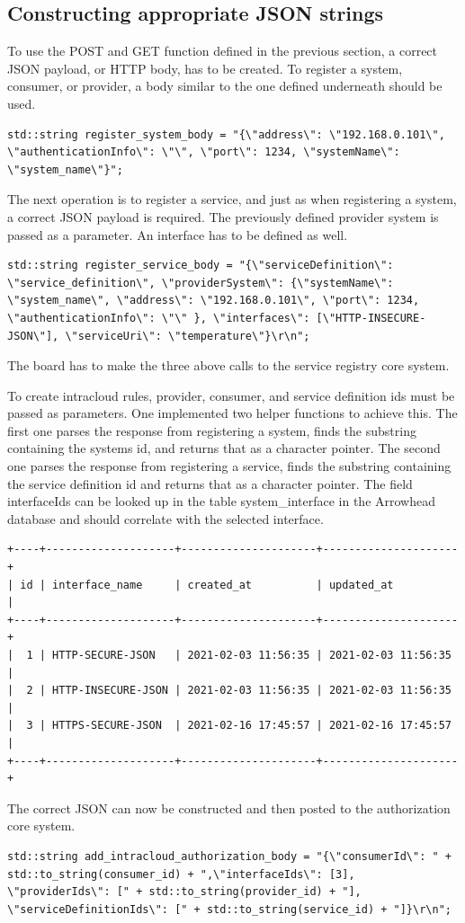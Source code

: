 \subsection{Constructing appropriate JSON strings}
To use the POST and GET function defined in the previous section, a correct JSON payload, or HTTP body, has to be created.
To register a system, consumer, or provider, a body similar to the one defined underneath should be used.
\begin{lstlisting}[style=CStyle]
    std::string register_system_body = "{\"address\": \"192.168.0.101\", \"authenticationInfo\": \"\", \"port\": 1234, \"systemName\": \"system_name\"}";
\end{lstlisting}

The next operation is to register a service, and just as when registering a system, a correct JSON payload is required.
The previously defined provider system is passed as a parameter.
An interface has to be defined as well.
\begin{lstlisting}[style=CStyle]
    std::string register_service_body = "{\"serviceDefinition\": \"service_definition\", \"providerSystem\": {\"systemName\": \"system_name\", \"address\": \"192.168.0.101\", \"port\": 1234, \"authenticationInfo\": \"\" }, \"interfaces\": [\"HTTP-INSECURE-JSON\"], \"serviceUri\": \"temperature\"}\r\n";
\end{lstlisting}
The board has to make the three above calls to the service registry core system.

To create intracloud rules, provider, consumer, and service definition ids must be passed as parameters.
One implemented two helper functions to achieve this.
The first one parses the response from registering a system, finds the substring containing the systems id, and returns that as a character pointer.
The second one parses the response from registering a service, finds the substring containing the service definition id and returns that as a character pointer.
The field interfaceIds can be looked up in the table system\_interface in the Arrowhead database and should correlate with the selected interface.
\begin{lstlisting}[style=SQLstyle]
+----+--------------------+---------------------+---------------------+
| id | interface_name     | created_at          | updated_at          |
+----+--------------------+---------------------+---------------------+
|  1 | HTTP-SECURE-JSON   | 2021-02-03 11:56:35 | 2021-02-03 11:56:35 |
|  2 | HTTP-INSECURE-JSON | 2021-02-03 11:56:35 | 2021-02-03 11:56:35 |
|  3 | HTTPS-SECURE-JSON  | 2021-02-16 17:45:57 | 2021-02-16 17:45:57 |
+----+--------------------+---------------------+---------------------+
\end{lstlisting}
The correct JSON can now be constructed and then posted to the authorization core system.
\begin{lstlisting}[style=CStyle]
    std::string add_intracloud_authorization_body = "{\"consumerId\": " + std::to_string(consumer_id) + ",\"interfaceIds\": [3], \"providerIds\": [" + std::to_string(provider_id) + "], \"serviceDefinitionIds\": [" + std::to_string(service_id) + "]}\r\n";
\end{lstlisting}

